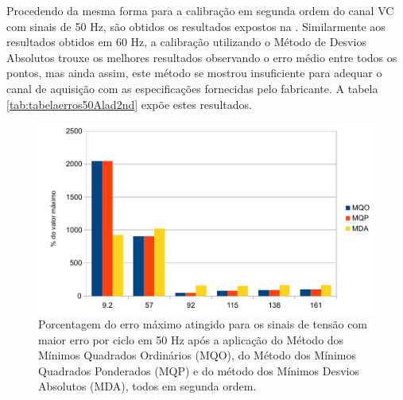\begin{table}[H]
\end{table}
  
    Procedendo da mesma forma para a calibração em segunda ordem do canal VC com sinais de 50 Hz, são obtidos os resultados expostos na . Similarmente aos resultados obtidos em 60 Hz, a calibração utilizando o Método de Desvios Absolutos trouxe os melhores resultados observando o erro médio entre todos os pontos, mas ainda assim, este método se mostrou insuficiente para adequar o canal de aquisição com as especificações fornecidas pelo fabricante. A tabela \ref{tab:tabelaerros50Alad2nd} expõe estes resultados.

  \begin{figure}[H]
    \caption{Porcentagem do erro máximo atingido para os sinais de tensão com maior erro por ciclo em 50 Hz após a aplicação do Método dos Mínimos Quadrados Ordinários (MQO), do Método dos Mínimos Quadrados Ponderados (MQP) e do método dos Mínimos Desvios Absolutos (MDA), todos em segunda ordem.}
    \label{fig:res_volt2nd50}
    \centering
    \includegraphics[width=0.9\linewidth]{pictures/max_err_VC_aftercalib50_2nd.pdf}
\end{figure}

